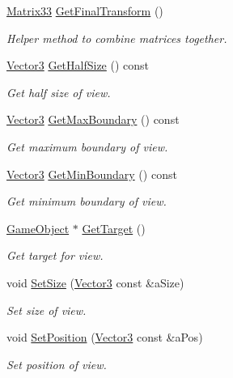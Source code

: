 \begin{DoxyCompactItemize}
\hyperlink{structMatrix33}{Matrix33} \hyperlink{classView_a100d422b3ed969d3405a3c1bcbe6f99d}{Get\+Final\+Transform} ()
\begin{DoxyCompactList}\small\item\em Helper method to combine matrices together. \end{DoxyCompactList}\item 
\hyperlink{structVector3}{Vector3} \hyperlink{classView_acbc3b948338603042b7d0600d13b7ed4}{Get\+Half\+Size} () const 
\begin{DoxyCompactList}\small\item\em Get half size of view. \end{DoxyCompactList}\item 
\hyperlink{structVector3}{Vector3} \hyperlink{classView_a28a048bc7efee4bbf31c3f70e46744aa}{Get\+Max\+Boundary} () const 
\begin{DoxyCompactList}\small\item\em Get maximum boundary of view. \end{DoxyCompactList}\item 
\hyperlink{structVector3}{Vector3} \hyperlink{classView_ac992dd57295b2abc2fdf5a01716a5028}{Get\+Min\+Boundary} () const 
\begin{DoxyCompactList}\small\item\em Get minimum boundary of view. \end{DoxyCompactList}\item 
\hyperlink{classGameObject}{Game\+Object} $\ast$ \hyperlink{classView_ac60fd3c0991ad9d78d5d1df2ac7b12c6}{Get\+Target} ()
\begin{DoxyCompactList}\small\item\em Get target for view. \end{DoxyCompactList}\item 
void \hyperlink{classView_a000cf3940bdffe6e72dd64f94ddc0cbf}{Set\+Size} (\hyperlink{structVector3}{Vector3} const \&a\+Size)
\begin{DoxyCompactList}\small\item\em Set size of view. \end{DoxyCompactList}\item 
void \hyperlink{classView_aa04523df15cad5eaed9b05d219a0757b}{Set\+Position} (\hyperlink{structVector3}{Vector3} const \&a\+Pos)
\begin{DoxyCompactList}\small\item\em Set position of view. \end{DoxyCompactList}\item 

\end{DoxyCompactItemize}
